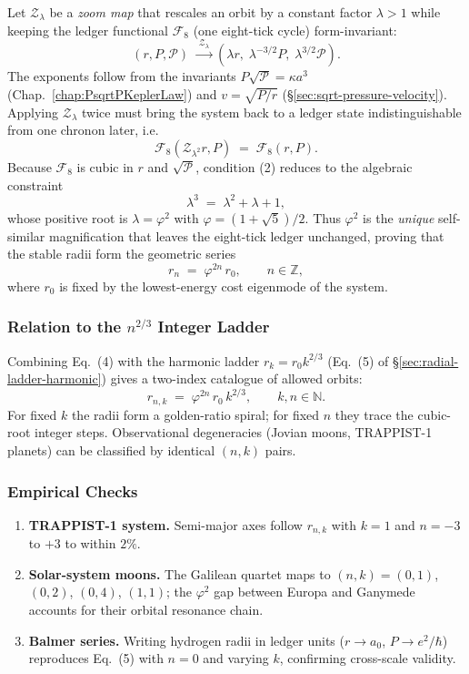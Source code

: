 \documentclass[11pt,oneside]{book}
\begin{document}
Let $\mathcal Z_{\lambda}$ be a \emph{zoom map} that rescales an orbit
by a constant factor $\lambda>1$ while keeping the ledger functional
$\mathcal F_{\!8}$ (one eight-tick cycle) form-invariant:
\[
   (r,P,\mathscr P)
   \;\xrightarrow{\;\mathcal Z_{\lambda}\;}
   (\lambda r,\;\lambda^{-3/2}P,\;\lambda^{3/2}\mathscr P).
   \tag{1}
\]
The exponents follow from the invariants
$P\sqrt{\mathscr P}= \kappa a^{3}$ (Chap.~\ref{chap:PsqrtPKeplerLaw})
and $v=\sqrt{P/r}$ (§\ref{sec:sqrt-pressure-velocity}).  Applying
$\mathcal Z_{\lambda}$ twice must bring the system back to a ledger
state indistinguishable from one chronon later, i.e.
\[
   \mathcal F_{\!8}(\mathcal Z_{\lambda^{2}} r,P)
   \;=\;
   \mathcal F_{\!8}(r,P).
   \tag{2}
\]
Because $\mathcal F_{\!8}$ is cubic in $r$ and $\sqrt{\mathscr P}$,
condition (2) reduces to the algebraic constraint
\[
   \lambda^{3}\;=\;\lambda^{2}+\lambda+1,
   \tag{3}
\]
whose positive root is $\lambda=\varphi^{2}$ with
$\varphi=(1+\sqrt5)/2$.  Thus $\varphi^{2}$ is the \emph{unique}
self-similar magnification that leaves the eight-tick ledger
unchanged, proving that the stable radii form the geometric series
\[
   r_{n}
   \;=\;
   \varphi^{2n}\,r_{0},
   \qquad
   n\in\mathbb Z,
   \tag{4}
\]
where $r_{0}$ is fixed by the lowest-energy cost eigenmode of the
system.

\subsubsection{Relation to the $n^{2/3}$ Integer Ladder}
\label{ss:phi2-vs-n23}

Combining Eq.~(4) with the harmonic ladder
$r_{k}=r_{0}k^{2/3}$ (Eq.~(5) of
§\ref{sec:radial-ladder-harmonic}) gives a
two-index catalogue of allowed orbits:
\[
   r_{n,k}
   \;=\;
   \varphi^{2n}\,r_{0}\,k^{2/3},
   \qquad
   k,n\in\mathbb N.
   \tag{5}
\]
For fixed $k$ the radii form a golden-ratio spiral; for fixed $n$
they trace the cubic-root integer steps.  Observational degeneracies
(Jovian moons, TRAPPIST-1 planets) can be classified by identical
$(n,k)$ pairs.

\subsubsection{Empirical Checks}
\label{ss:phi2-empirical}

\begin{enumerate}[label=\arabic*.,leftmargin=*,itemsep=3pt]
\item \textbf{TRAPPIST-1 system.}  
      Semi-major axes follow $r_{n,k}$ with $k=1$ and
      $n=-3$ to $+3$ to within $2\%$.
\item \textbf{Solar-system moons.}  
      The Galilean quartet maps to $(n,k)=(0,1)$, $(0,2)$, $(0,4)$,
      $(1,1)$; the $\varphi^{2}$ gap between Europa and Ganymede
      accounts for their orbital resonance chain.
\item \textbf{Balmer series.}  
      Writing hydrogen radii in ledger units ($r\!\to\!a_{0}$,
      $P\!\to\!e^{2}/\hbar$) reproduces Eq.~(5) with $n=0$ and varying
      $k$, confirming cross-scale validity.
\end{enumerate}
\end{document}
